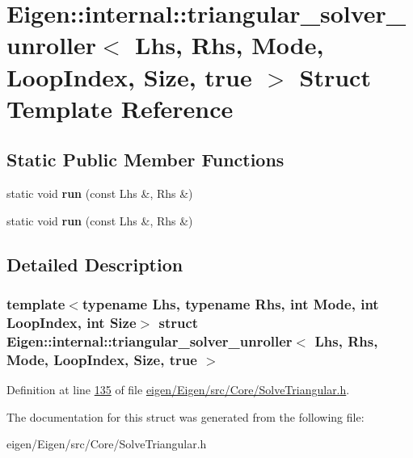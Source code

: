 \hypertarget{struct_eigen_1_1internal_1_1triangular__solver__unroller_3_01_lhs_00_01_rhs_00_01_mode_00_01_loo770c06e8f4c15ef547184369307ea3d8}{}\section{Eigen\+:\+:internal\+:\+:triangular\+\_\+solver\+\_\+unroller$<$ Lhs, Rhs, Mode, Loop\+Index, Size, true $>$ Struct Template Reference}
\label{struct_eigen_1_1internal_1_1triangular__solver__unroller_3_01_lhs_00_01_rhs_00_01_mode_00_01_loo770c06e8f4c15ef547184369307ea3d8}
\subsection*{Static Public Member Functions}
\begin{DoxyCompactItemize}
\item 
\mbox{\label{struct_eigen_1_1internal_1_1triangular__solver__unroller_3_01_lhs_00_01_rhs_00_01_mode_00_01_loo770c06e8f4c15ef547184369307ea3d8_afbd7c6ee84a0fe7bc21df5f3853573d5}} 
static void {\bfseries run} (const Lhs \&, Rhs \&)
\item 
\mbox{\label{struct_eigen_1_1internal_1_1triangular__solver__unroller_3_01_lhs_00_01_rhs_00_01_mode_00_01_loo770c06e8f4c15ef547184369307ea3d8_afbd7c6ee84a0fe7bc21df5f3853573d5}} 
static void {\bfseries run} (const Lhs \&, Rhs \&)
\end{DoxyCompactItemize}


\subsection{Detailed Description}
\subsubsection*{template$<$typename Lhs, typename Rhs, int Mode, int Loop\+Index, int Size$>$\newline
struct Eigen\+::internal\+::triangular\+\_\+solver\+\_\+unroller$<$ Lhs, Rhs, Mode, Loop\+Index, Size, true $>$}



Definition at line \hyperlink{eigen_2_eigen_2src_2_core_2_solve_triangular_8h_source_l00135}{135} of file \hyperlink{eigen_2_eigen_2src_2_core_2_solve_triangular_8h_source}{eigen/\+Eigen/src/\+Core/\+Solve\+Triangular.\+h}.



The documentation for this struct was generated from the following file\+:\begin{DoxyCompactItemize}
\item 
eigen/\+Eigen/src/\+Core/\+Solve\+Triangular.\+h\end{DoxyCompactItemize}
